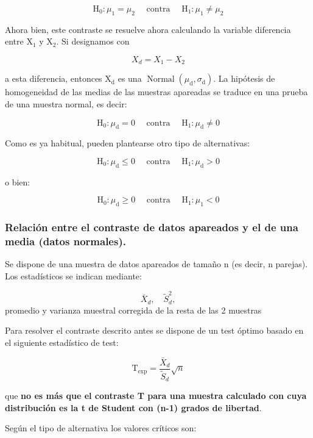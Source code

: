 \documentclass[
]{article}
\begin{document}
\[
\mathrm{H}_{0}: \mu_{1}=\mu_{2} \quad \text { contra } \quad \mathrm{H}_{1}: \mu_{1} \neq \mu_{2}
\]

Ahora bien, este contraste se resuelve ahora calculando la variable diferencia entre \(\mathrm{X}_{1}\) y \(\mathrm{X}_{2}\). Si designamos con

\[
X_{d}=X_{1}-X_{2}
\]

a esta diferencia, entonces \(\mathrm{X}_{\mathrm{d}}\) es una \(\operatorname{Normal}\left(\mu_{\mathrm{d}}, \sigma_{\mathrm{d}}\right)\). La hipótesis de homogeneidad de las medias de las muestras apareadas se traduce en una prueba de una muestra normal, es decir:

\[
\mathrm{H}_{0}: \mu_{\mathrm{d}}=0 \quad \text { contra } \quad \mathrm{H}_{1}: \mu_{\mathrm{d}} \neq 0
\]

Como es ya habitual, pueden plantearse otro tipo de alternativas:

\[
\mathrm{H}_{0}: \mu_{\mathrm{d}} \leq 0 \quad \text { contra } \quad \mathrm{H}_{1}: \mu_{\mathrm{d}}>0
\]

o bien:

\[
\mathrm{H}_{0}: \mu_{\mathrm{d}} \geq 0 \quad \text { contra } \quad \mathrm{H}_{1}: \mu_{1}<0
\]

\subsubsection{Relación entre el contraste de datos apareados y el de una media (datos normales).}\label{relaciuxf3n-entre-el-contraste-de-datos-apareados-y-el-de-una-media-datos-normales.}

Se dispone de una muestra de datos apareados de tamaño n (es decir, n parejas). Los estadísticos se indican mediante:

\[\bar{X}_{d}, \quad \widetilde{S}_{d}^{2},\]
promedio y varianza muestral corregida de la resta de las 2 muestras

Para resolver el contraste descrito antes se dispone de un test óptimo basado en el siguiente estadístico de test:

\[
\mathrm{T}_{\exp }=\frac{\bar{X}_{d}}{\widetilde{S}_{d}} \sqrt{n}
\]

que \textbf{no es más que el contraste T para una muestra calculado con cuya distribución es la t de Student con (n-1) grados de libertad}.

Según el tipo de alternativa los valores críticos son:
\end{document}
